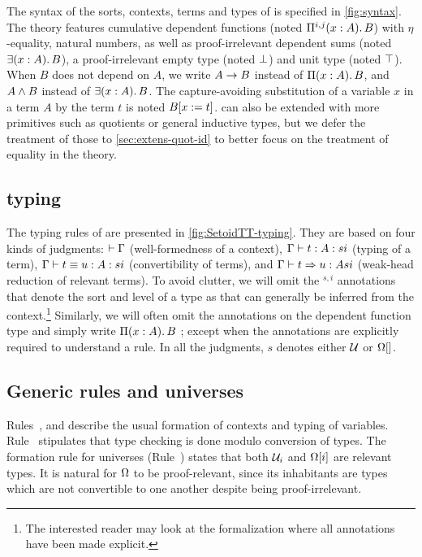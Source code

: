 The syntax of the sorts, contexts, terms and types of \SetoidTT is
specified in \cref{fig:syntax}.
%
The theory features cumulative dependent functions (noted $\Depfunannotated{A}{B}{s}{i}{j}$) with
\( \eta \)-equality, natural numbers, as well as proof-irrelevant dependent
sums (noted $\Exists{A}{B}$), a proof-irrelevant empty type (noted
$\Empty$) and unit type (noted $\Unit$).
%
When \( B \) does not depend on \( A \), we write \( \Fun{A}{B} \) instead of
\( \Depfun{A}{B} \), and \( \Prod{A}{B} \) instead of \( \Exists{A}{B} \). The capture-avoiding
substitution of a variable \( x \) in a term \( A \) by the term \( t \) is noted
\( \subst{B}{t} \).
%
\SetoidTT can also be extended with more primitives such as quotients or general inductive types,
but we defer the treatment of those to \cref{sec:extens-quot-id} to better focus on the
treatment of equality in the theory.

\subsection{typing}

The typing rules of \SetoidTT are presented in \cref{fig:SetoidTT-typing}.
%
They are based on four kinds of judgments: \( \wfctx{\Gamma} \) (well-formedness
of a context), \( \tytmannotated{\Gamma}{t}{A}{s}{i} \) (typing of a term),
\( \eqtmannotated{\Gamma}{t}{u}{A}{s}{i} \) (convertibility of terms), and
\( \redannotated{\Gamma}{t}{u}{A}{s}{i} \) (weak-head reduction of
relevant terms).
%
To avoid clutter, we will omit the \( {}^{s,i} \) annotations that
denote the sort and level of a
type as that can generally be inferred from the context.\footnote{The
  interested reader may look at the \Agda formalization where all
  annotations have been made explicit.}
%
Similarly, we will often omit the annotations on the dependent function
type and simply write $\Depfun{A}{B}$ ; except when the annotations are explicitly
required to understand a rule.
%
In all the judgments, $s$ denotes either $\Type$ or $\sProp[]$.


\subsection{Generic rules and universes}

Rules~,  and  describe the
usual formation of contexts and typing of variables. Rule~
stipulates that type checking is done modulo conversion of types.
%
The formation rule for universes (Rule~) states
that both \( \Type_i \) and \( \sProp[i] \) are relevant types. It is natural
for \( \sProp \) to be proof-relevant, since its inhabitants are
types which are not convertible to one another despite being proof-irrelevant.


